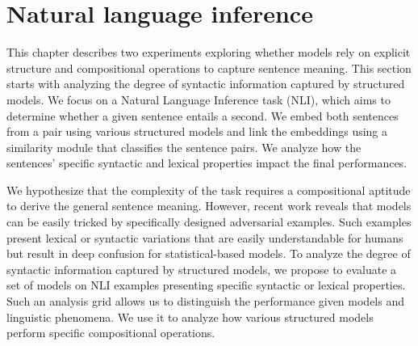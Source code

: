 

\section{Natural language inference}




This chapter describes two experiments exploring whether models rely on explicit structure and compositional operations to capture sentence meaning. This section starts with analyzing the degree of syntactic information captured by structured models. We focus on a Natural Language Inference task (NLI), which aims to determine whether a given sentence entails a second. We embed both sentences from a pair using various structured models and link the embeddings using a similarity module that classifies the sentence pairs. We analyze how the sentences' specific syntactic and lexical properties impact the final performances.

We hypothesize that the complexity of the task requires a compositional aptitude to derive the general sentence meaning. However, recent work reveals that models can be easily tricked by specifically designed adversarial examples. Such examples present lexical or syntactic variations that are easily understandable for humans but result in deep confusion for statistical-based models. 
To analyze the degree of syntactic information captured by structured models, we propose to evaluate a set of models on NLI examples presenting specific syntactic or lexical properties. Such an analysis grid allows us to distinguish the performance given models and linguistic phenomena. We use it to analyze how various structured models perform specific compositional operations.

